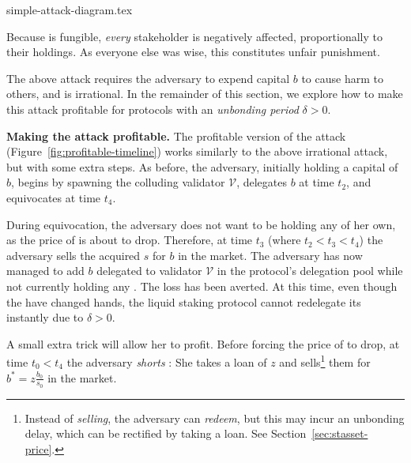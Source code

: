 {simple-attack-diagram.tex}


Because \stasset is fungible, \emph{every} stakeholder is negatively affected,
proportionally to their holdings.
As everyone else was
wise, this constitutes unfair punishment.

The above attack requires the adversary to expend capital $b$ to cause
harm to others, and is irrational. In the remainder of this section, we
explore how to make this attack profitable for protocols with an
\emph{unbonding period} $\delta > 0$.

\noindent
\textbf{Making the attack profitable.}
The profitable version of the attack (Figure~\ref{fig:profitable-timeline}) works similarly to the above
irrational attack, but with some extra steps. As before, the adversary, initially
holding a capital of $b$, begins by spawning the colluding validator $\mathcal{V}$,
delegates $b$ at time $t_2$, and equivocates at time $t_4$.

During equivocation, the adversary does not want to be holding any
\stasset of her own, as the price of \stasset is about to drop.
Therefore, at time $t_3$ (where $t_2 < t_3 < t_4$) the adversary sells
the acquired $s$ \stasset for $b$ \asset in the market.
The adversary has now managed to add $b$ \asset delegated to validator $\mathcal{V}$
in the protocol's delegation pool while not currently holding
any \stasset. The loss has been averted. At this time, even though the
\stassets have changed hands, the liquid staking protocol cannot redelegate
its \assets instantly due to $\delta > 0$.

A small extra trick will allow her to profit.
Before forcing the price of \stasset to drop, at time $t_0 < t_4$
the adversary \emph{shorts}
\stasset: She takes a loan of $z$ \stassets and
sells\footnote{Instead of \emph{selling}, the adversary can \emph{redeem}, but
this may incur an unbonding delay, which can be rectified by taking a loan.
See Section~\ref{sec:stasset-price}.}
them for $b^* = z \frac{b_0}{s_0}$ \asset in the market.

